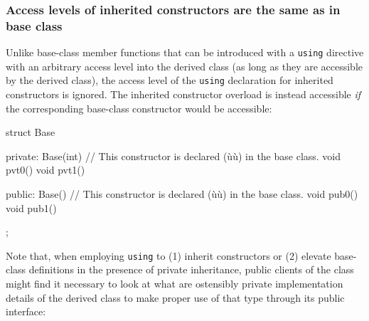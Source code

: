 \subsubsection[Access levels of inherited constructors are the same as in base class]{Access levels of inherited constructors are the same as in base class}\label{access-levels-of-inherited-constructors-are-same-as-in-base-class}

Unlike base-class member functions that can be introduced with a
\lstinline!using! directive with an arbitrary access level into the derived
class (as long as they are accessible by the derived class), the access
level of the \lstinline!using! declaration for inherited constructors is
ignored. The inherited constructor overload is instead
accessible \emph{if} the corresponding base-class constructor would be
accessible:

\begin{emcppslisting}[emcppsbatch=e13]
struct Base
{
private:
    Base(int) { }  // This constructor is declared (ù{}ù) in the base class.
    void pvt0() { }
    void pvt1() { }

public:
    Base() { }     // This constructor is declared (ù{}ù) in the base class.
    void pub0() { }
    void pub1() { }
};
\end{emcppslisting}
    
\noindent Note that, when employing \lstinline!using! to (1) inherit constructors or
(2) elevate base-class definitions in the presence of private
inheritance, public clients of the class might find it necessary 
to look at what are ostensibly private implementation details of the
derived class to make proper use of that type through its
public interface:

